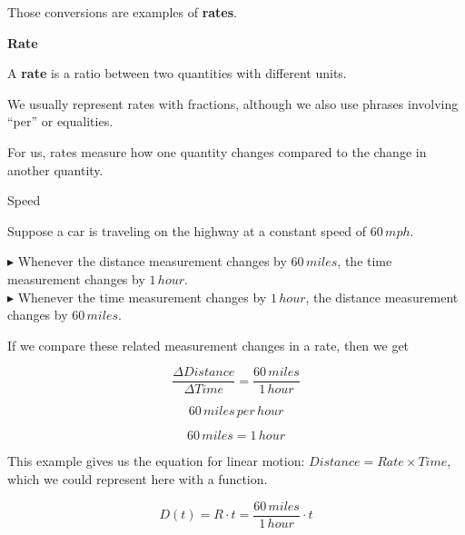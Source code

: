 \documentclass{ximera}
\begin{document}
Those conversions are examples of \textbf{rates}. 








\begin{definition} \textbf{\textcolor{green!50!black}{Rate}} 

A \textbf{rate} is a ratio between two quantities with different units.   



We usually represent rates with fractions, although we also use phrases involving ``per'' or equalities.

\end{definition}


For us, rates measure how one quantity changes compared to the change in another quantity.











\begin{example} Speed


Suppose a car is traveling on the highway at a constant speed of $60 \, mph$.


$\blacktriangleright$ Whenever the distance measurement changes by $60 \, miles$, the time measurement changes by $1 \, hour$. \\
$\blacktriangleright$ Whenever the time measurement changes by $1 \, hour$, the distance measurement changes by $60 \, miles$. 




If we compare these related measurement changes in a rate, then we get

\[
\frac{\Delta Distance}{\Delta Time} = \frac{60 \, miles}{1 \, hour} 
\]

\[
60 \,miles \, per \, hour
\]

\[
60 \,miles = 1 \, hour
\]

\end{example} 



This example gives us the equation for linear motion: $Distance = Rate \times Time$, which we could represent here with a function.

\[
D(t) = R \cdot t =  \frac{60 \, miles}{1 \, hour} \cdot t
\]
\end{document}
